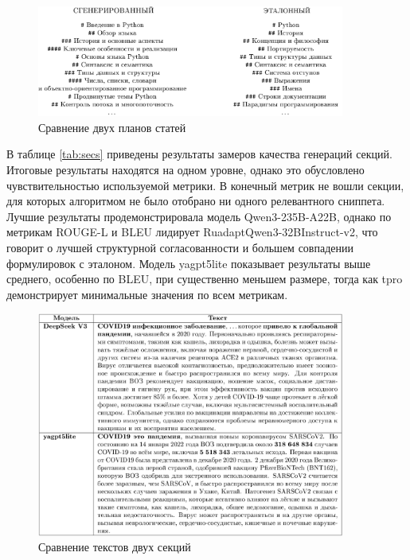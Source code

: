 \documentclass{article}
\begin{document}
\begin{figure}[ht!]
  \centering
  \includegraphics[width=0.9\textwidth]{figures/outline.png}
  \caption{Сравнение двух планов статей}
  \label{fig:outline}
\end{figure}

В таблице \ref{tab:secs} приведены результаты замеров качества генераций секций. Итоговые результаты находятся на одном уровне, однако это обусловлено чувствительностью используемой метрики.
В конечный метрик не вошли секции, для которых алгоритмом не было отобрано ни одного релевантного сниппета. Лучшие результаты 
продемонстрировала модель Qwen3-\allowbreak 235B-\allowbreak A22B, однако по метрикам ROUGE-\allowbreak L и BLEU лидирует RuadaptQwen3-\allowbreak 32BInstruct-v2, что говорит о лучшей структурной согласованности и 
большем совпадении формулировок с эталоном.
Модель yagpt5lite показывает результаты выше среднего, особенно по BLEU, при существенно меньшем размере, тогда как tpro демонстрирует минимальные значения по всем метрикам.


\begin{figure}[ht!]
  \centering
  \includegraphics[width=0.9\textwidth]{figures/two_secs.png}
  \caption{Сравнение текстов двух секций}
  \label{fig:secs_com}
\end{figure}
\end{document}
